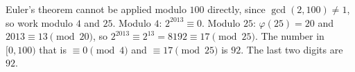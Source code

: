Euler's theorem cannot be applied modulo $100$ directly, since $\gcd(2,100)\ne1$, so work modulo $4$ and $25$. Modulo $4$: $2^{2013}\equiv0$. Modulo $25$: $\varphi(25)=20$ and $2013\equiv13\pmod{20}$, so $2^{2013}\equiv2^{13}=8192\equiv17\pmod{25}$. The number in $[0,100)$ that is $\equiv0\pmod4$ and $\equiv17\pmod{25}$ is $92$. The last two digits are $\boxed{92}$.

